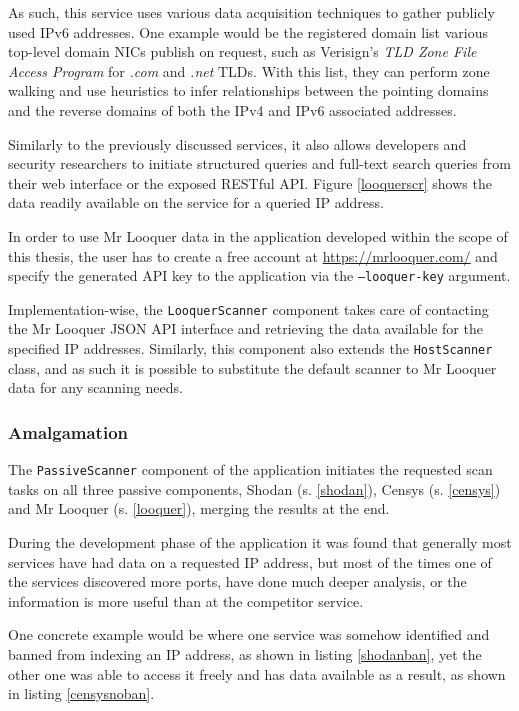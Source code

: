\documentclass[a4paper,12pt]{article}
\begin{document}
	As such, this service uses various data acquisition techniques to gather publicly used IPv6 addresses. One example would be the registered domain list various top-level domain NICs publish on request, such as Verisign's \textit{TLD Zone File Access Program}\cite{verisign16} for \textit{.com} and \textit{.net} TLDs. With this list, they can perform zone walking and use heuristics to infer relationships between the pointing domains and the reverse domains of both the IPv4 and IPv6 associated addresses.
	
	Similarly to the previously discussed services, it also allows developers and security researchers to initiate structured queries and full-text search queries from their web interface or the exposed RESTful API. Figure \ref{looquerscr} shows the data readily available on the service for a queried IP address.
	
	In order to use Mr Looquer data in the application developed within the scope of this thesis, the user has to create a free account at \url{https://mrlooquer.com/} and specify the generated API key to the application via the \texttt{--looquer-key} argument.
		
	Implementation-wise, the \texttt{LooquerScanner} component takes care of contacting the Mr Looquer JSON API interface and retrieving the data available for the specified IP addresses. Similarly, this component also extends the \texttt{HostScanner} class, and as such it is possible to substitute the default scanner to Mr Looquer data for any scanning needs.

\subsubsection{Amalgamation}
 

	The \texttt{PassiveScanner} component of the application initiates the requested scan tasks on all three passive components, Shodan (s. \ref{shodan}), Censys (s. \ref{censys}) and Mr Looquer (s. \ref{looquer}), merging the results at the end.
	
	During the development phase of the application it was found that generally most services have had data on a requested IP address, but most of the times one of the services discovered more ports, have done much deeper analysis, or the information is more useful than at the competitor service.
	
	One concrete example would be where one service was somehow identified and banned from indexing an IP address, as shown in listing \ref{shodanban}, yet the other one was able to access it freely and has data available as a result, as shown in listing \ref{censysnoban}.
	
\end{document}

